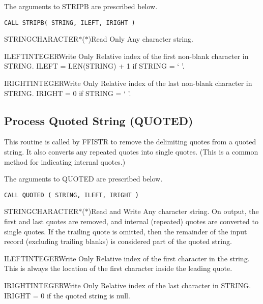 The arguments to STRIPB are prescribed below.

\verb+CALL STRIPB( STRING, ILEFT, IRIGHT )+

\begin{argy}{STRING}{CHARACTER$*$($*$)}{Read Only}
Any character string.
\end{argy}

\begin{argy}{ILEFT}{INTEGER}{Write Only}
Relative index of the first non-blank character in
STRING.  ILEFT = LEN(STRING) + 1 if STRING = ` '.
\end{argy}

\begin{argy}{IRIGHT}{INTEGER}{Write Only}
Relative index of the last non-blank character in
STRING.  IRIGHT = 0 if STRING = ` '.
\end{argy}

\subsection{Process Quoted String (QUOTED)}\label{sec:quoted}
This routine is called by FFISTR to remove the delimiting quotes from a
quoted string. It also converts any repeated quotes into single quotes.
(This is a common method for indicating internal quotes.)

The arguments to QUOTED are prescribed below.

\verb+CALL QUOTED ( STRING, ILEFT, IRIGHT )+

\begin{argy}{STRING}{CHARACTER$*$($*$)}{Read and Write}
Any character string. On output, the first and last quotes are removed, and
internal (repeated) quotes are converted to single quotes. If the trailing
quote is omitted, then the remainder of the input record (excluding trailing
blanks) is considered part of the quoted string.
\end{argy}

\begin{argy}{ILEFT}{INTEGER}{Write Only}
Relative index of the first character in the string. This is always the
location of the first character inside the leading quote.
\end{argy}

\begin{argy}{IRIGHT}{INTEGER}{Write Only}
Relative index of the last character in
STRING.  IRIGHT = 0 if the quoted string is null.
\end{argy}
